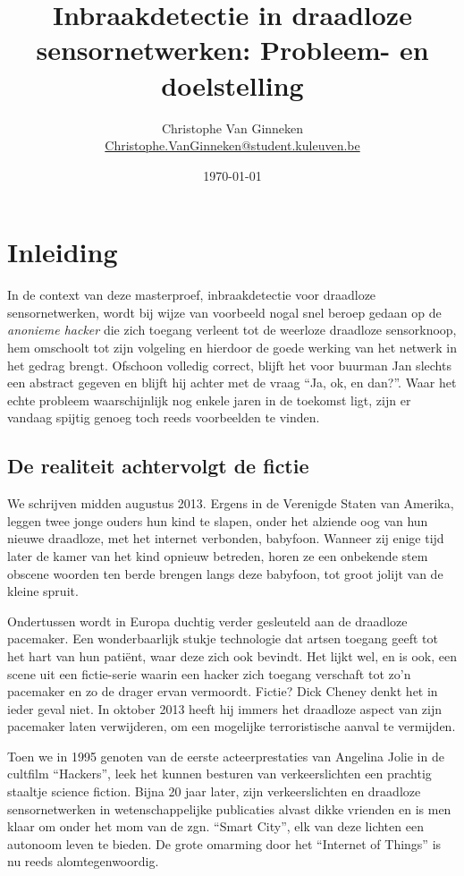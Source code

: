 \documentclass[12pt,a4paper]{article}
\author{Christophe Van Ginneken\\\url{Christophe.VanGinneken@student.kuleuven.be}}
\title{Inbraakdetectie in draadloze sensornetwerken: Probleem- en doelstelling}
\date{\today}
\begin{document}
\maketitle

\section*{Inleiding}

In de context van deze masterproef, inbraakdetectie voor draadloze sensornetwerken,
wordt bij wijze van voorbeeld nogal snel beroep gedaan op de \emph{anonieme
hacker} die zich toegang verleent tot de weerloze draadloze sensorknoop, hem
omschoolt tot zijn volgeling en hierdoor de goede werking van het netwerk in
het gedrag brengt. Ofschoon volledig correct, blijft het voor buurman Jan
slechts een abstract gegeven en blijft hij achter met de vraag ``Ja, ok, en
dan?''. Waar het echte probleem waarschijnlijk nog enkele jaren in de toekomst
ligt, zijn er vandaag spijtig genoeg toch reeds voorbeelden te vinden.

\subsection*{De realiteit achtervolgt de fictie}

We schrijven midden augustus 2013. Ergens in de Verenigde Staten van Amerika,
leggen twee jonge ouders hun kind te slapen, onder het alziende oog van hun
nieuwe draadloze, met het internet verbonden, babyfoon. Wanneer zij enige tijd
later de kamer van het kind opnieuw betreden, horen ze een onbekende stem
obscene woorden ten berde brengen langs deze babyfoon, tot groot jolijt van de
kleine spruit.

Ondertussen wordt in Europa duchtig verder gesleuteld aan de draadloze
pacemaker. Een wonderbaarlijk stukje technologie dat artsen toegang geeft tot
het hart van hun pati\"ent, waar deze zich ook bevindt. Het lijkt wel, en is
ook, een scene uit een fictie-serie waarin een hacker zich toegang verschaft
tot zo'n pacemaker en zo de drager ervan vermoordt. Fictie? Dick Cheney denkt
het in ieder geval niet. In oktober 2013 heeft hij immers het draadloze aspect
van zijn pacemaker laten verwijderen, om een mogelijke terroristische aanval te
vermijden.

Toen we in 1995 genoten van de eerste acteerprestaties van Angelina Jolie in de
cultfilm ``Hackers'', leek het kunnen besturen van verkeerslichten een prachtig
staaltje science fiction. Bijna 20 jaar later, zijn verkeerslichten en
draadloze sensornetwerken in wetenschappelijke publicaties alvast dikke
vrienden en is men klaar om onder het mom van de zgn. ``Smart City'', elk van
deze lichten een autonoom leven te bieden. De grote omarming door het
``Internet of Things'' is nu reeds alomtegenwoordig.
\end{document}
